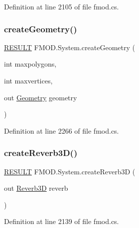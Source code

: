 Definition at line 2105 of file fmod.\+cs.

\mbox{\label{class_f_m_o_d_1_1_system_ac6fcb87f4a5eb35c8ef19eb94902b548}} 
\subsubsection{\texorpdfstring{create\+Geometry()}{createGeometry()}}
{\footnotesize\ttfamily \hyperlink{namespace_f_m_o_d_a305d1176ef3f8c8815861a60407ac33d}{R\+E\+S\+U\+LT} F\+M\+O\+D.\+System.\+create\+Geometry (\begin{DoxyParamCaption}\item[{int}]{maxpolygons,  }\item[{int}]{maxvertices,  }\item[{out \hyperlink{class_f_m_o_d_1_1_geometry}{Geometry}}]{geometry }\end{DoxyParamCaption})}



Definition at line 2266 of file fmod.\+cs.

\mbox{\label{class_f_m_o_d_1_1_system_a732b5a43833f53e328ad64f2015d048a}} 
\subsubsection{\texorpdfstring{create\+Reverb3\+D()}{createReverb3D()}}
{\footnotesize\ttfamily \hyperlink{namespace_f_m_o_d_a305d1176ef3f8c8815861a60407ac33d}{R\+E\+S\+U\+LT} F\+M\+O\+D.\+System.\+create\+Reverb3D (\begin{DoxyParamCaption}\item[{out \hyperlink{class_f_m_o_d_1_1_reverb3_d}{Reverb3D}}]{reverb }\end{DoxyParamCaption})}



Definition at line 2139 of file fmod.\+cs.

\mbox{\label{class_f_m_o_d_1_1_system_acaeb5380facc7fd7c2c990e03c5841cf}} 
